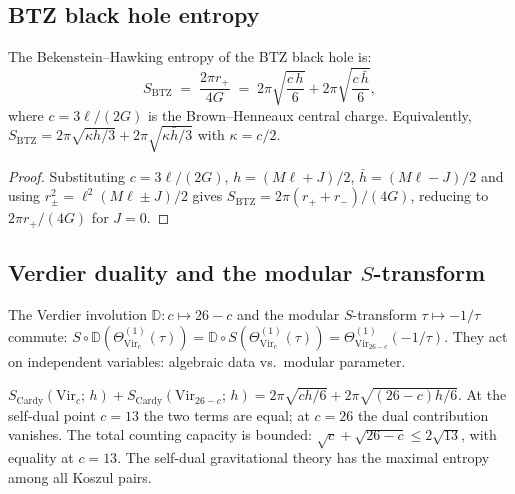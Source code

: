 \documentclass[11pt]{article}
\begin{document}
\subsection{BTZ black hole entropy}
\label{subsec:btz-entropy-identification}

\begin{theorem}
\label{thm:btz-entropy-wn}
The Bekenstein--Hawking entropy of the BTZ black hole is:
\begin{equation}\label{eq:btz-entropy-final-wn}
\boxed{
S_{\mathrm{BTZ}}
\;=\;
\frac{2\pi r_+}{4G}
\;=\;
2\pi\sqrt{\frac{c\,h}{6}}
+
2\pi\sqrt{\frac{c\,\bar h}{6}},
}
\end{equation}
where $c = 3\ell/(2G)$ is the Brown--Henneaux central charge.
Equivalently, $S_{\mathrm{BTZ}} = 2\pi\sqrt{\kappa h/3}
+ 2\pi\sqrt{\kappa\bar h/3}$ with $\kappa = c/2$.
\end{theorem}

\begin{proof}
Substituting $c = 3\ell/(2G)$, $h = (M\ell+J)/2$,
$\bar h = (M\ell-J)/2$ and using
$r_\pm^2 = \ell^2(M\ell \pm J)/2$ gives
$S_{\mathrm{BTZ}} = 2\pi(r_+ + r_-)/(4G)$, reducing to
$2\pi r_+/(4G)$ for $J = 0$.
\end{proof}

\subsection{Verdier duality and the modular $S$-transform}
\label{subsec:btz-verdier-modular}

\begin{proposition}
\label{prop:btz-D-S-commute-wn}
The Verdier involution $\mathbb{D}\colon c \mapsto 26-c$ and the
modular $S$-transform $\tau \mapsto -1/\tau$ commute:
$S \circ \mathbb{D}(\Theta_{\mathrm{Vir}_c}^{(1)}(\tau))
= \mathbb{D} \circ S(\Theta_{\mathrm{Vir}_c}^{(1)}(\tau))
= \Theta_{\mathrm{Vir}_{26-c}}^{(1)}(-1/\tau)$.
They act on independent variables: algebraic data vs.\ modular
parameter.
\end{proposition}

\begin{theorem}
\label{thm:btz-paired-cardy-wn}
$S_{\mathrm{Cardy}}(\mathrm{Vir}_c;\,h)
+ S_{\mathrm{Cardy}}(\mathrm{Vir}_{26-c};\,h)
= 2\pi\sqrt{ch/6} + 2\pi\sqrt{(26-c)h/6}$.
At the self-dual point $c = 13$ the two terms are equal;
at $c = 26$ the dual contribution vanishes.
The total counting capacity is bounded:
$\sqrt{c} + \sqrt{26-c} \le 2\sqrt{13}$, with equality at
$c = 13$.  The self-dual gravitational theory has the maximal
entropy among all Koszul pairs.
\end{theorem}
\end{document}
